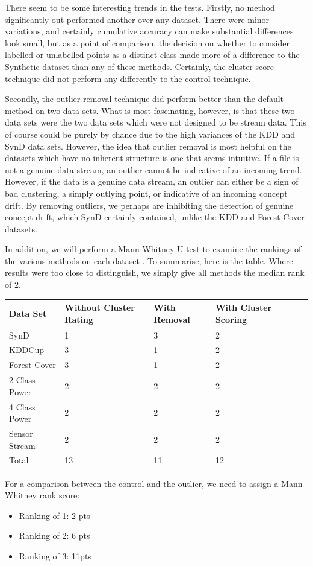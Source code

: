 \documentclass[12pt,a4paper,oneside]{report}
\begin{document}
There seem to be some interesting trends in the tests. Firstly, no method significantly out-performed another over any dataset. There were minor variations, and certainly cumulative accuracy can make substantial differences look small, but as a point of comparison, the decision on whether to consider labelled or unlabelled points as a distinct class made more of a difference to the Synthetic dataset than any of these methods. Certainly, the cluster score technique did not perform any differently to the control technique. 

Secondly, the outlier removal technique did perform better than the default method on two data sets. What is most fascinating, however, is that these two data sets were the two data sets which were not designed to be stream data. This of course could be purely by chance due to the high variances of the KDD and SynD data sets. However, the idea that outlier removal is most helpful on the datasets which have no inherent structure is one that seems intuitive.  If a file is not a genuine data stream, an outlier cannot be indicative of an incoming trend. However, if the data is a genuine data stream, an outlier can either be a sign of bad clustering, a simply outlying point, or indicative of an incoming concept drift. By removing outliers, we perhaps are inhibiting the detection of genuine concept drift, which SynD certainly contained, unlike the KDD and Forest Cover datasets. 

In addition, we will perform a Mann Whitney U-test to examine the rankings of the various methods on each dataset \cite{Mann}. 
To summarise, here is the table. Where results were too close to distinguish, we simply give all methods the median rank of 2.

\begin{center}
  \begin{tabular}{| l | l | l | l | l | l}
    \hline   
    Data Set & Without Cluster Rating & With Removal & With Cluster Scoring \\ \hline
    SynD & 1& 3 & 2 \\ \hline
    KDDCup & 3 &1 &2 \\ \hline
    Forest Cover & 3 & 1 & 2  \\ \hline
    2 Class Power & 2 & 2 & 2 \\ \hline
    4 Class Power & 2 & 2 & 2 \\ \hline
    Sensor Stream & 2 & 2 & 2 \\ \hline
    Total & 13 & 11 & 12 \\ \hline
  \end{tabular}
\end{center}
For a comparison between the control and the outlier, we need to assign a Mann-Whitney rank score:
\begin{itemize}
	\item Ranking of 1: 2 pts
	\item Ranking of 2: 6 pts
	\item Ranking of 3: 11pts
\end{itemize}
\end{document}

